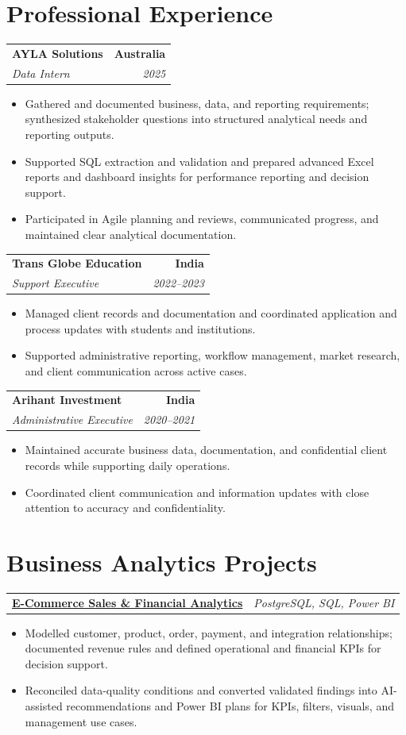 \documentclass[letterpaper,10pt]{article}
\makeatletter
\newcommand{\role}[4]{%
  \begin{tabularx}{\textwidth}{@{}Xr@{}}
    \textbf{#1} & \textbf{#2} \\
    \textit{#3} & \textit{#4}
  \end{tabularx}\vspace{-1pt}
}
\newcommand{\project}[2]{%
  \begin{tabularx}{\textwidth}{@{}Xr@{}}
    \textbf{#1} & \textit{#2}
  \end{tabularx}\vspace{-1pt}
}
\makeatother
\begin{document}
\section{Professional Experience}
\role{AYLA Solutions}{Australia}{Data Intern}{2025}
\begin{itemize}
  \item Gathered and documented business, data, and reporting requirements; synthesized stakeholder questions into structured analytical needs and reporting outputs.
  \item Supported SQL extraction and validation and prepared advanced Excel reports and dashboard insights for performance reporting and decision support.
  \item Participated in Agile planning and reviews, communicated progress, and maintained clear analytical documentation.
\end{itemize}
\vspace{1pt}

\role{Trans Globe Education}{India}{Support Executive}{2022--2023}
\begin{itemize}
  \item Managed client records and documentation and coordinated application and process updates with students and institutions.
  \item Supported administrative reporting, workflow management, market research, and client communication across active cases.
\end{itemize}
\vspace{1pt}

\role{Arihant Investment}{India}{Administrative Executive}{2020--2021}
\begin{itemize}
  \item Maintained accurate business data, documentation, and confidential client records while supporting daily operations.
  \item Coordinated client communication and information updates with close attention to accuracy and confidentiality.
\end{itemize}

\section{Business Analytics Projects}
\project{\href{https://github.com/jainalimehta/Ecommerce-Sales-Analytics}{E-Commerce Sales \& Financial Analytics}}{PostgreSQL, SQL, Power BI}
\begin{itemize}
  \item Modelled customer, product, order, payment, and integration relationships; documented revenue rules and defined operational and financial KPIs for decision support.
  \item Reconciled data-quality conditions and converted validated findings into AI-assisted recommendations and Power BI plans for KPIs, filters, visuals, and management use cases.
\end{itemize}
\vspace{1pt}
\end{document}
